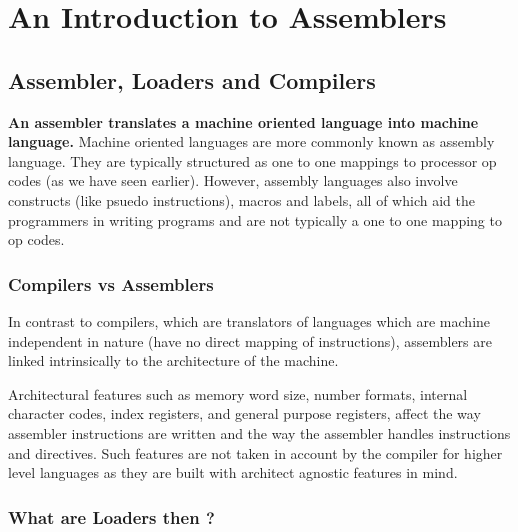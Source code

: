 
\part{An Introduction to Assemblers}



\chapter{Assembler, Loaders and Compilers}

\textbf{An assembler translates a machine oriented language into machine language.} Machine oriented languages are more commonly known as assembly language. They are typically structured as one to one mappings to processor op codes (as we have seen earlier). However, assembly languages  also involve constructs (like psuedo instructions), macros and labels, all of which aid the programmers in writing programs and are not typically a one to one mapping to op codes.

\section{Compilers vs Assemblers}

In contrast to compilers, which are translators of languages which are machine independent in nature (have no direct mapping of instructions), assemblers are linked intrinsically to the architecture of the machine.

Architectural features such as memory word size, number formats, internal character codes, index registers, and general purpose registers, affect the way assembler instructions are written and the way the assembler handles instructions and directives. Such features are not taken in account by the compiler for higher level languages as they are built with architect agnostic features in mind.

\section{What are Loaders then ?}

